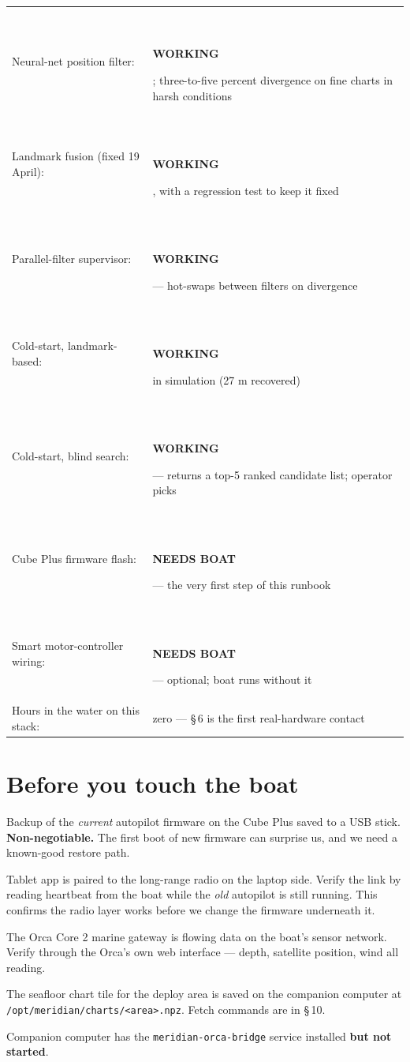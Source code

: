 \documentclass[10pt,a4paper]{article}
\newcommand{\checkbox}{\raisebox{-0.4ex}{\large$\square$}\,}
\newcommand{\badge}[2]{{\small\color{white}\colorbox{#1}{\,\strut\bfseries\sffamily #2\,}}}
\newcommand{\statusbuilt}{\badge{mSafe}{WORKING}}
\newcommand{\statushw}{\badge{mDim}{NEEDS BOAT}}
\begin{document}
\begin{warnbox}
\begin{tabular}{@{}l@{\hskip 10pt}l@{}}
Neural-net position filter: & \statusbuilt{}; three-to-five percent divergence on fine charts in harsh conditions \\
Landmark fusion (fixed 19 April): & \statusbuilt{}, with a regression test to keep it fixed \\
Parallel-filter supervisor: & \statusbuilt{} --- hot-swaps between filters on divergence \\
Cold-start, landmark-based: & \statusbuilt{} in simulation (27 m recovered) \\
Cold-start, blind search: & \statusbuilt{} --- returns a top-5 ranked candidate list; operator picks \\
Cube Plus firmware flash: & \statushw{} --- the very first step of this runbook \\
Smart motor-controller wiring: & \statushw{} --- optional; boat runs without it \\
Hours in the water on this stack: & zero --- §\,6 is the first real-hardware contact \\
\end{tabular}
\end{warnbox}

\clearpage
\pagestyle{fancy}
\setcounter{page}{1}

\section{Before you touch the boat}

\begin{stepbox}
\begin{checklist}
\item[\checkbox] Backup of the \emph{current} autopilot firmware on the Cube Plus saved to a USB stick. \textbf{Non-negotiable.} The first boot of new firmware can surprise us, and we need a known-good restore path.
\item[\checkbox] Tablet app is paired to the long-range radio on the laptop side. Verify the link by reading heartbeat from the boat while the \emph{old} autopilot is still running. This confirms the radio layer works before we change the firmware underneath it.
\item[\checkbox] The Orca Core 2 marine gateway is flowing data on the boat's sensor network. Verify through the Orca's own web interface --- depth, satellite position, wind all reading.
\item[\checkbox] The seafloor chart tile for the deploy area is saved on the companion computer at \texttt{/opt/meridian/charts/<area>.npz}. Fetch commands are in §\,10.
\item[\checkbox] Companion computer has the \texttt{meridian-orca-bridge} service installed \textbf{but not started}.
\end{checklist}
\end{stepbox}
\end{document}

